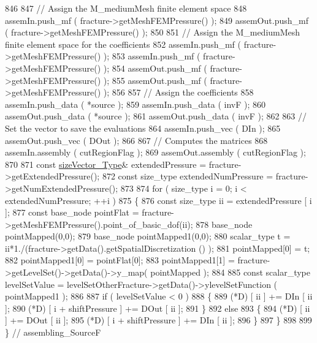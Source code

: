 \begin{DoxyCode}
846 
847     \textcolor{comment}{// Assign the M\_mediumMesh finite element space}
848     assemIn.push\_mf ( fracture->getMeshFEMPressure() );
849     assemOut.push\_mf ( fracture->getMeshFEMPressure() );
850 
851     \textcolor{comment}{// Assign the M\_mediumMesh finite element space for the coefficients}
852     assemIn.push\_mf ( fracture->getMeshFEMPressure() );
853     assemIn.push\_mf ( fracture->getMeshFEMPressure() );
854     assemOut.push\_mf ( fracture->getMeshFEMPressure() );
855     assemOut.push\_mf ( fracture->getMeshFEMPressure() );
856 
857     \textcolor{comment}{// Assign the coefficients}
858     assemIn.push\_data ( *source );
859     assemIn.push\_data ( invF );
860     assemOut.push\_data ( *source );
861     assemOut.push\_data ( invF );
862 
863     \textcolor{comment}{// Set the vector to save the evaluations}
864     assemIn.push\_vec ( DIn );
865     assemOut.push\_vec ( DOut );
866 
867     \textcolor{comment}{// Computes the matrices}
868     assemIn.assembly ( cutRegionFlag );
869     assemOut.assembly ( cutRegionFlag );
870 
871     \textcolor{keyword}{const} \hyperlink{Core_8h_a83c51913d041a5001e8683434c09857f}{sizeVector\_Type}& extendedPressure = fracture->getExtendedPressure();
872     \textcolor{keyword}{const} size\_type extendedNumPressure = fracture->getNumExtendedPressure();
873 
874     \textcolor{keywordflow}{for} ( size\_type i = 0; i < extendedNumPressure; ++i )
875     \{
876         \textcolor{keyword}{const} size\_type ii = extendedPressure [ i ];
877         \textcolor{keyword}{const} base\_node pointFlat = fracture->getMeshFEMPressure().point\_of\_basic\_dof(ii);
878         base\_node pointMapped(0,0);
879         base\_node pointMapped1(0,0);
880     scalar\_type t = ii*1./(fracture->getData().getSpatialDiscretization () );
881         pointMapped[0] = t;
882         pointMapped1[0] = pointFlat[0];
883         pointMapped1[1] = fracture->getLevelSet()->getData()->y\_map( pointMapped );
884         
885     \textcolor{keyword}{const} scalar\_type levelSetValue = levelSetOtherFracture->getData()->ylevelSetFunction ( pointMapped1 );
886 
887         \textcolor{keywordflow}{if} ( levelSetValue < 0 )
888         \{
889             (*D) [ ii ] += DIn [ ii ];
890             (*D) [ i + shiftPressure ] += DOut [ ii ];
891         \}
892         \textcolor{keywordflow}{else}
893         \{
894             (*D) [ ii ] += DOut [ ii ];
895             (*D) [ i + shiftPressure ] += DIn [ ii ];
896         \}
897     \}
898 
899 \} \textcolor{comment}{// assembling\_SourceF}
\end{DoxyCode}

